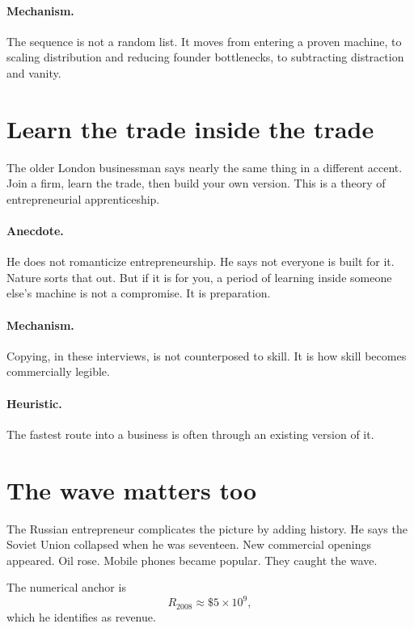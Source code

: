 \documentclass[11pt,oneside]{book}
\begin{document}
\paragraph{Mechanism.} The sequence is not a random list. It moves from entering a proven machine, to scaling distribution and reducing founder bottlenecks, to subtracting distraction and vanity.

\section{Learn the trade inside the trade}

The older London businessman says nearly the same thing in a different accent. Join a firm, learn the trade, then build your own version. This is a theory of entrepreneurial apprenticeship.

\paragraph{Anecdote.} He does not romanticize entrepreneurship. He says not everyone is built for it. Nature sorts that out. But if it is for you, a period of learning inside someone else's machine is not a compromise. It is preparation.

\paragraph{Mechanism.} Copying, in these interviews, is not counterposed to skill. It is how skill becomes commercially legible.

\paragraph{Heuristic.} The fastest route into a business is often through an existing version of it.

\section{The wave matters too}

The Russian entrepreneur complicates the picture by adding history. He says the Soviet Union collapsed when he was seventeen. New commercial openings appeared. Oil rose. Mobile phones became popular. They caught the wave.

The numerical anchor is
\begin{equation}
R_{2008} \approx \$5\times 10^{9},
\end{equation}
which he identifies as revenue.
\end{document}
